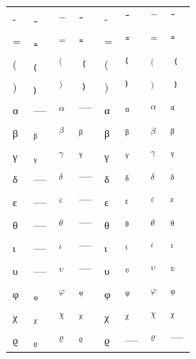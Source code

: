 \documentclass{standalone}
\begin{document}
\begin{tabular}{ll|ll|ll|ll}
\textsubscript{-} & ₋ & $_{-}$ & $₋$ & \textsuperscript{-} & ⁻ & $^{-}$ & $⁻$ \\
\textsubscript{=} & ₌ & $_{=}$ & $₌$ & \textsuperscript{=} & ⁼ & $^{=}$ & $⁼$ \\
\textsubscript{(} & ₍ & $_{(}$ & $₍$ & \textsuperscript{(} & ⁽ & $^{(}$ & $⁽$ \\  %
\textsubscript{)} & ₎ & $_{)}$ & $₎$ & \textsuperscript{)} & ⁾ & $^{)}$ & $⁾$ \\  %
\midrule
\textsubscript{α} & — & $_{α}$ & $—$ & \textsuperscript{α} & ᵅ & $^{α}$ & $ᵅ$ \\
\textsubscript{β} & ᵦ & $_{β}$ & $ᵦ$ & \textsuperscript{β} & ᵝ & $^{β}$ & $ᵝ$ \\
\textsubscript{γ} & ᵧ & $_{γ}$ & $ᵧ$ & \textsuperscript{γ} & ᵞ & $^{γ}$ & $ᵞ$ \\
\textsubscript{δ} & — & $_{δ}$ & $—$ & \textsuperscript{δ} & ᵟ & $^{δ}$ & $ᵟ$ \\
\textsubscript{ε} & — & $_{ε}$ & $—$ & \textsuperscript{ε} & ᵋ & $^{ε}$ & $ᵋ$ \\
\textsubscript{θ} & — & $_{θ}$ & $—$ & \textsuperscript{θ} & ᶿ & $^{θ}$ & $ᶿ$ \\
\textsubscript{ι} & — & $_{ι}$ & $—$ & \textsuperscript{ι} & ᶥ & $^{ι}$ & $ᶥ$ \\
\textsubscript{υ} & — & $_{υ}$ & $—$ & \textsuperscript{υ} & ᶹ & $^{υ}$ & $ᶹ$ \\
\textsubscript{φ} & ᵩ & $_{φ}$ & $ᵩ$ & \textsuperscript{φ} & ᵠ & $^{φ}$ & $ᵠ$ \\
\textsubscript{χ} & ᵪ & $_{χ}$ & $ᵪ$ & \textsuperscript{χ} & ᵡ & $^{χ}$ & $ᵡ$ \\
\textsubscript{ϱ} & ᵨ & $_{ϱ}$ & $ᵨ$ & \textsuperscript{ϱ} & — & $^{ϱ}$ & $—$ \\
\bottomrule
\end{tabular}
\end{document}
